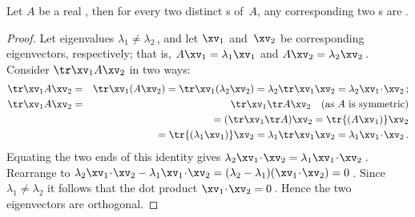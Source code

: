 \begin{theorem} \label{thm:orthoevec} 
Let \(A\) be a real , then for every two distinct s of~\(A\), any corresponding two s are .
\end{theorem}
\begin{proof} 
Let eigenvalues \(\lambda_1\neq\lambda_2\)\,, and let \(\xv_1\) and~\(\xv_2\) be corresponding eigenvectors, respectively; that is, \(A\xv_1=\lambda_1\xv_1\) and \(A\xv_2=\lambda_2\xv_2\)\,.
Consider \(\tr\xv_1A\xv_2\) in two ways:
\begin{eqnarray*}
\tr\xv_1A\xv_2
&=&\tr\xv_1(A\xv_2)
=\tr\xv_1(\lambda_2\xv_2)
=\lambda_2\tr\xv_1\xv_2
=\lambda_2\xv_1\cdot\xv_2\,;
\\\tr\xv_1A\xv_2&=&\tr\xv_1\tr A\xv_2\quad\text{(as \(A\) is symmetric)}
\\&&{}=(\tr\xv_1\tr A)\xv_2
=\tr{(A\xv_1)}\xv_2
\\&&{}=\tr{(\lambda_1\xv_1)}\xv_2
=\lambda_1\tr\xv_1\xv_2
=\lambda_1\xv_1\cdot\xv_2\,.
\end{eqnarray*}
Equating the two ends of this identity gives \(\lambda_2\xv_1\cdot\xv_2=\lambda_1\xv_1\cdot\xv_2\)\,.
Rearrange to \(\lambda_2\xv_1\cdot\xv_2-\lambda_1\xv_1\cdot\xv_2
=(\lambda_2-\lambda_1)(\xv_1\cdot\xv_2)=0\)\,.
Since \(\lambda_1\neq\lambda_2\) it follows that the dot product \(\xv_1\cdot\xv_2=0\)\,.
Hence the two eigenvectors are orthogonal.
\end{proof}



